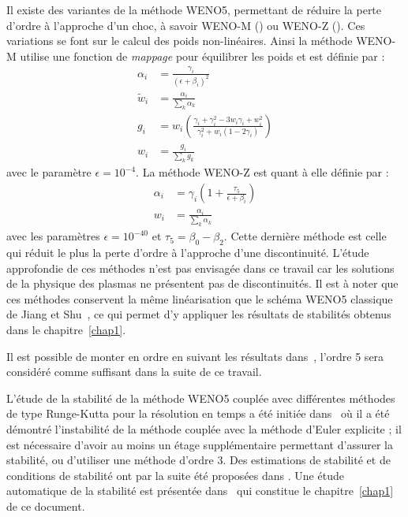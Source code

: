 Il existe des variantes de la méthode WENO5, permettant de réduire la perte d'ordre à l'approche d'un choc, à savoir WENO-M (\cite{Henrick:2005}) ou WENO-Z (\cite{Borges:2008}). Ces variations se font sur le calcul des poids non-linéaires. Ainsi la méthode WENO-M utilise une fonction de \emph{mappage} pour équilibrer les poids et est définie par :
$$
  \begin{aligned}
    \alpha_i    &= \frac{\gamma_i}{(\epsilon + \beta_i)^2} \\
    \tilde{w}_i &= \frac{\alpha_i}{\sum_k \alpha_k} \\
    g_i         &= w_i\left( \frac{\gamma_i + \gamma_i^2 - 3w_i\gamma_i + w_i^2}{\gamma_i^2 + w_i(1-2\gamma_i)} \right) \\
    w_i         &= \frac{g_i}{\sum_k g_k}
  \end{aligned}
$$
avec le paramètre $\epsilon = 10^{-4}$. La méthode WENO-Z est quant à elle définie par :
$$
  \begin{aligned}
    \alpha_i &= \gamma_i\left( 1+ \frac{\tau_5}{\epsilon + \beta_i} \right) \\
    w_i      &= \frac{\alpha_i}{\sum_k \alpha_k}
  \end{aligned}
$$
avec les paramètres $\epsilon = 10^{-40}$ et $\tau_5 = \beta_0 - \beta_2$. Cette dernière méthode est celle qui réduit le plus la perte d'ordre à l'approche d'une discontinuité. L'étude approfondie de ces méthodes n'est pas envisagée dans ce travail car les solutions de la physique des plasmas ne présentent pas de discontinuités. Il est à noter que ces méthodes conservent la même linéarisation que le schéma WENO5 classique de Jiang et Shu~\cite{Jiang:1996}, ce qui permet d'y appliquer les résultats de stabilités obtenus dans le chapitre~\ref{chap1}.

Il est possible de monter en ordre en suivant les résultats dans~\cite{Wu:2021}, l'ordre 5 sera considéré comme suffisant dans la suite de ce travail.

L'étude de la stabilité de la méthode WENO5 couplée avec différentes méthodes de type Runge-Kutta pour la résolution en temps a été initiée dans~\cite{Wang:2007} où il a été démontré l'instabilité de la méthode couplée avec la méthode d'Euler explicite ; il est nécessaire d'avoir au moins un étage supplémentaire permettant d'assurer la stabilité, ou d'utiliser une méthode d'ordre 3. Des estimations de stabilité et de conditions de stabilité ont par la suite été proposées dans \cite{Motamed:2010,Lunet:2017}. Une étude automatique de la stabilité est présentée dans~\cite{Crouseilles:2019b} qui constitue le chapitre~\ref{chap1} de ce document.

